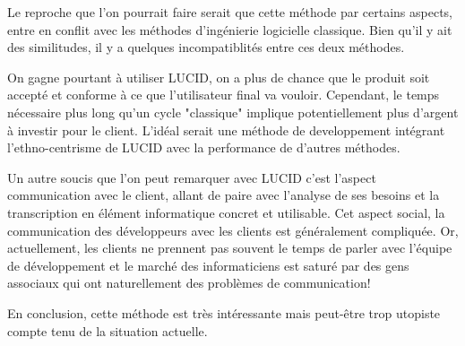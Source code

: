 \documentclass[11pt,a4paper]{article}
\begin{document}
Le reproche que l'on pourrait faire serait que cette méthode par certains
aspects, entre en conflit avec les méthodes d'ingénierie logicielle classique. 
Bien qu'il y ait des similitudes, il y a quelques incompatiblités entre ces
deux méthodes.

On gagne pourtant à utiliser LUCID, on a  plus de chance que le produit soit
accepté et conforme à ce que l'utilisateur final va vouloir. Cependant, le temps
nécessaire plus long qu'un cycle "classique" implique potentiellement plus
d'argent à investir pour le client. L'idéal serait une méthode de developpement
intégrant l'ethno-centrisme de LUCID avec la performance de d'autres méthodes.

Un autre soucis que l'on peut remarquer avec LUCID c'est l'aspect communication
avec le client, allant de paire avec l'analyse de ses besoins et la
transcription en élément informatique concret et utilisable. Cet aspect social,
la communication des développeurs avec les clients est généralement compliquée.
Or, actuellement, les clients ne prennent pas souvent le temps de parler avec
l'équipe de développement et le marché des informaticiens est saturé par des
gens associaux qui ont naturellement des problèmes de communication!

En conclusion, cette méthode est très intéressante mais peut-être trop utopiste
compte tenu de la situation actuelle.


  
  
\end{document}

